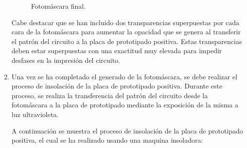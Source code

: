 \begin{enumerate}
    \begin{figure}[H]
    \centering
    \caption{Fotomáscara final.}
    \end{figure}
    
    Cabe destacar que se han incluido dos transparencias superpuestas por cada cara de la fotomáscara para aumentar la opacidad que se genera al transferir el patrón del circuito a la placa de prototipado positiva. Estas transparencias deben estar superpuestas con una exactitud muy elevada para impedir desfases en la impresión del circuito.
    
    \item Una vez se ha completado el generado de la fotomáscara, se debe realizar el proceso de insolación de la placa de prototipado positiva. Durante este proceso, se realiza la transferencia del patrón del circuito desde la fotomáscara a la placa de prototipado mediante la exposición de la misma a luz ultravioleta.
    
    A continuación se muestra el proceso de insolación de la placa de prototipado positiva, el cual se ha realizado usando una maquina insoladora:
    


\end{enumerate}
